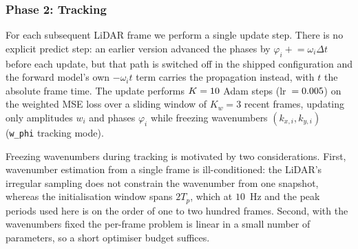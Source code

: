 \documentclass[review]{elsarticle}
\begin{document}

\subsubsection{Phase 2: Tracking}

For each subsequent LiDAR frame we perform a single update step. There is no
explicit predict step: an earlier version advanced the phases by
$\varphi_i \mathrel{+}= \omega_i \Delta t$ before each update, but that path is
switched off in the shipped configuration and the forward model's own
$-\omega_i t$ term carries the propagation instead, with $t$ the absolute frame
time. The update performs $K=10{}$ Adam steps
(lr~$=0.005{}$) on the weighted MSE loss over a sliding window of
$K_w=3$ recent frames, updating only amplitudes $w_i$ and phases $\varphi_i$ while
freezing wavenumbers $(k_{x,i}, k_{y,i})$ (\texttt{w\_phi} tracking mode).

Freezing wavenumbers during tracking is motivated by two considerations.
First, wavenumber estimation from a single frame is ill-conditioned: the LiDAR's
irregular sampling does not constrain the wavenumber from one snapshot, whereas
the initialisation window spans $2T_p$, which at $10$~Hz and the peak periods used
here is on the order of one to two hundred frames.
Second, with the wavenumbers fixed the per-frame problem is linear in a small
number of parameters, so a short optimiser budget suffices.
\end{document}

